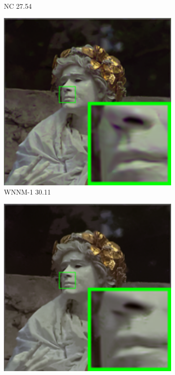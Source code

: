 \begin{figure}
\begin{subfigure}[t]{0.19\textwidth}
		\caption{NC 27.54}
    \end{subfigure}
    \hfill
    \begin{subfigure}[t]{0.19\textwidth}
        \centering
        \includegraphics[width=1\textwidth]{images/mcwnnm/24images/resize_br_WNNMCW_nSig301050_kodim17.png}
		\caption{WNNM-1 30.11}
    \end{subfigure}
    \hfill
    \begin{subfigure}[t]{0.19\textwidth}
        \centering
        \includegraphics[width=1\textwidth]{images/mcwnnm/24images/resize_br_WNNMJ_nSig301050_kodim17.png}

\end{subfigure}
\end{figure}

